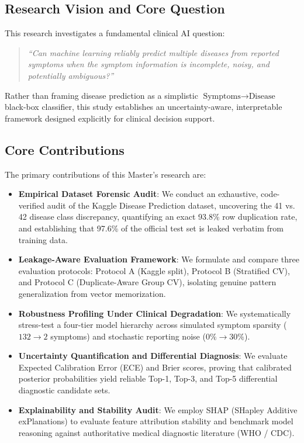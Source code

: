 \subsection{Research Vision and Core Question}
This research investigates a fundamental clinical AI question:
\begin{quote}
\emph{``Can machine learning reliably predict multiple diseases from reported symptoms when the symptom information is incomplete, noisy, and potentially ambiguous?''}
\end{quote}

Rather than framing disease prediction as a simplistic $\text{Symptoms} \to \text{Disease}$ black-box classifier, this study establishes an uncertainty-aware, interpretable framework designed explicitly for clinical decision support.

\subsection{Core Contributions}
The primary contributions of this Master's research are:
\begin{itemize}
    \item \textbf{Empirical Dataset Forensic Audit}: We conduct an exhaustive, code-verified audit of the Kaggle Disease Prediction dataset, uncovering the 41 vs. 42 disease class discrepancy, quantifying an exact 93.8\% row duplication rate, and establishing that 97.6\% of the official test set is leaked verbatim from training data.
    \item \textbf{Leakage-Aware Evaluation Framework}: We formulate and compare three evaluation protocols: Protocol A (Kaggle split), Protocol B (Stratified CV), and Protocol C (Duplicate-Aware Group CV), isolating genuine pattern generalization from vector memorization.
    \item \textbf{Robustness Profiling Under Clinical Degradation}: We systematically stress-test a four-tier model hierarchy across simulated symptom sparsity ($132 \to 2$ symptoms) and stochastic reporting noise ($0\% \to 30\%$).
    \item \textbf{Uncertainty Quantification and Differential Diagnosis}: We evaluate Expected Calibration Error (ECE) and Brier scores, proving that calibrated posterior probabilities yield reliable Top-1, Top-3, and Top-5 differential diagnostic candidate sets.
    \item \textbf{Explainability and Stability Audit}: We employ SHAP (SHapley Additive exPlanations) to evaluate feature attribution stability and benchmark model reasoning against authoritative medical diagnostic literature (WHO / CDC).
\end{itemize}
